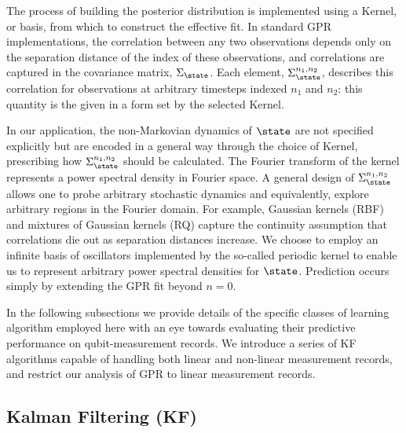 The process of building the posterior distribution is implemented using a Kernel, or basis, from which to construct the effective fit.  In standard GPR implementations, the correlation between any two observations depends only on the separation distance of the index of these observations, and correlations are captured in the covariance matrix, $\Sigma_\state$. Each element, $\Sigma_\state^{n_1, n_2}$, describes this correlation for observations at arbitrary timesteps indexed $n_1$ and $n_2$: this quantity is the given in a form set by the selected Kernel. 

In our application, the non-Markovian dynamics of $\state$ are not specified explicitly but are encoded in a general way through the choice of Kernel, prescribing how $\Sigma_\state^{n_1, n_2}$ should be calculated. The Fourier transform of the kernel represents a power spectral density in Fourier space. A general design of $\Sigma_\state^{n_1, n_2}$ allows one to probe arbitrary stochastic dynamics and equivalently, explore arbitrary regions in the Fourier domain. For example, Gaussian kernels (RBF) and mixtures of Gaussian kernels (RQ) capture the continuity assumption that correlations die out as separation distances increase. We choose to employ an infinite basis of oscillators implemented by the so-called periodic kernel to enable us to represent arbitrary power spectral densities for $\state$.  Prediction occurs simply by extending the GPR fit beyond $n=0$.

In the following subsections we provide details of the specific classes of learning algorithm employed here with an eye towards evaluating their predictive performance on qubit-measurement records.  We introduce a series of KF algorithms capable of handling both linear and non-linear measurement records, and restrict our analysis of GPR to linear measurement records. 



\subsection{ Kalman Filtering (KF)}\label{Subsec:KF}


